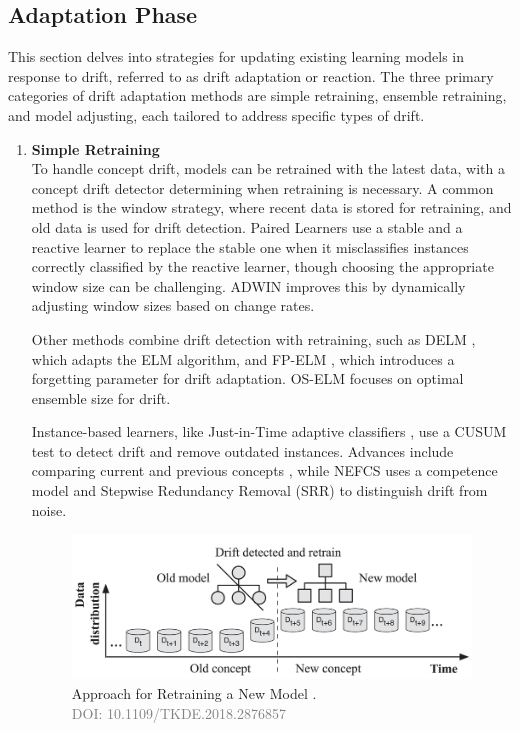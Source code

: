\subsection{Adaptation Phase}
This section delves into strategies for updating existing learning models in response to drift, referred to as drift adaptation or reaction. The three primary categories of drift adaptation methods are simple retraining, ensemble retraining, and model adjusting, each tailored to address specific types of drift.

\begin{enumerate}[label=\Alph*.]
    \setlength{\itemsep}{0pt}
    \setlength{\parskip}{0pt}
    \item \textbf{Simple Retraining} \\
    To handle concept drift, models can be retrained with the latest data, with a concept drift detector determining when retraining is necessary. A common method is the window strategy, where recent data is stored for retraining, and old data is used for drift detection. Paired Learners \cite{bach2008paired} use a stable and a reactive learner to replace the stable one when it misclassifies instances correctly classified by the reactive learner, though choosing the appropriate window size can be challenging. ADWIN \cite{bifet2007learning} improves this by dynamically adjusting window sizes based on change rates.

Other methods combine drift detection with retraining, such as DELM \cite{xu2017dynamic}, which adapts the ELM algorithm, and FP-ELM \cite{liu2016fp}, which introduces a forgetting parameter for drift adaptation. OS-ELM \cite{soares2016adaptive} focuses on optimal ensemble size for drift.

Instance-based learners, like Just-in-Time adaptive classifiers \cite{alippi2008just}, use a CUSUM test \cite{manly2000cumulative} to detect drift and remove outdated instances. Advances include comparing current and previous concepts \cite{silva2013data, alippi2008just}, while NEFCS \cite{lu2016concept} uses a competence model and Stepwise Redundancy Removal (SRR) \cite{lu2016concept} to distinguish drift from noise.
    

\begin{figure}[!ht]
    \centering
    \includegraphics[width=.9\textwidth]{2_Background/figures/retrain.png}
    \caption{Approach for Retraining a New Model \cite{8496795}. \\ \textcolor{gray}{\fontsize{10}{0}\selectfont DOI: 10.1109/TKDE.2018.2876857}}
    \label{fig:concept-drift-adaptation}
\end{figure}






\end{enumerate}
